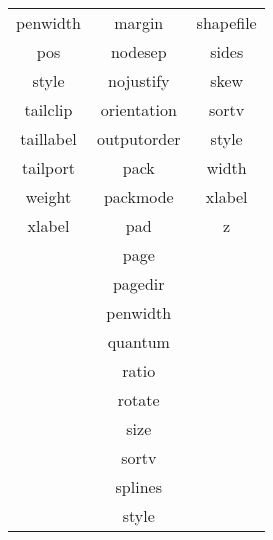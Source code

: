 \begin{table}[h!]
\begin{tabular}{c c c}
    penwidth       & margin        & shapefile     \\
    pos            & nodesep       & sides         \\
    style          & nojustify     & skew          \\
    tailclip       & orientation   & sortv         \\
    taillabel      & outputorder   & style         \\
    tailport       & pack          & width         \\
    weight         & packmode      & xlabel        \\
    xlabel         & pad           & z             \\
                   & page          &               \\
                   & pagedir       &               \\
                   & penwidth      &               \\
                   & quantum       &               \\
                   & ratio         &               \\
                   & rotate        &               \\
                   & size          &               \\
                   & sortv         &               \\
                   & splines       &               \\
                   & style         &               \\
    \hline
  \end{tabular}
\end{table}

